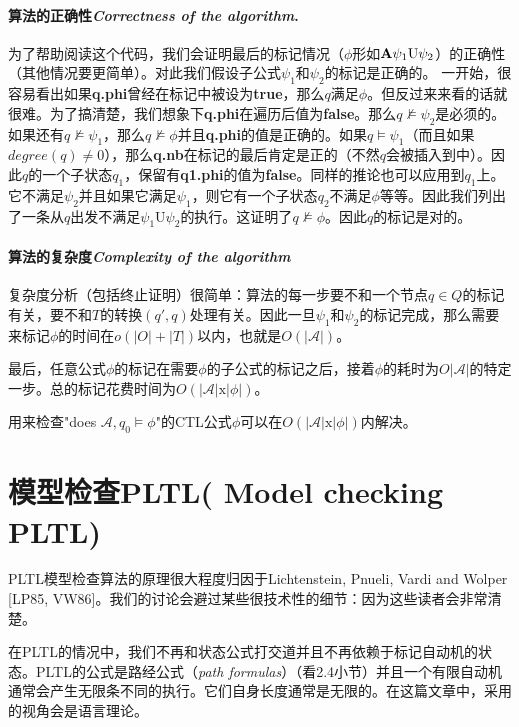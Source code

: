 \documentclass{book}
\begin{document}
    \paragraph{算法的正确性{\itshape Correctness of the algorithm}.}为了帮助阅读这个代码，我们会证明最后的标记情况（$\phi$形如$\text{\textbf{A}}\psi_1\text{U}\psi_2$）的正确性（其他情况要更简单）。对此我们假设子公式$\psi_1$和$\psi_2$的标记是正确的。 一开始，很容易看出如果\textbf{q.phi}曾经在标记中被设为\textbf{true}，那么$q$满足$\phi$。但反过来来看的话就很难。为了搞清楚，我们想象下\textbf{q.phi}在遍历后值为\textbf{false}。那么$q\nvDash\psi_2$是必须的。如果还有$q\nvDash\psi_1$，那么$q\nvDash\phi$并且\textbf{q.phi}的值是正确的。如果$q\models\psi_1$（而且如果$degree(q) \neq 0$），那么\textbf{q.nb}在标记的最后肯定是正的（不然$q$会被插入到中）。因此$q$的一个子状态$q_1$，保留有\textbf{q1.phi}的值为\textbf{false}。同样的推论也可以应用到$q_1$上。它不满足$\psi_2$并且如果它满足$\psi_1$，则它有一个子状态$q_2$不满足$\phi$等等。因此我们列出了一条从$q$出发不满足$\psi_1\text{U}\psi_2$的执行。这证明了$q\nvDash\phi$。因此$q$的标记是对的。

    \paragraph{算法的复杂度{\itshape Complexity of the algorithm}}复杂度分析（包括终止证明）很简单：算法的每一步要不和一个节点$q\in Q$的标记有关，要不和$T$的转换$(q',q)$处理有关。因此一旦$\psi_1$和$\psi_2$的标记完成，那么需要来标记$\phi$的时间在$o(|O|+|T|)$以内，也就是$O(|\mathcal{A}|)$。

    最后，任意公式$\phi$的标记在需要$\phi$的子公式的标记之后，接着$\phi$的耗时为$O|\mathcal{A}|$的特定一步。总的标记花费时间为$O(|\mathcal{A}|\text{x}|\phi|)$。

    用来检查"does $\mathcal{A},q_0\models\phi$"的CTL公式$\phi$可以在$O(|\mathcal{A}|\text{x}|\phi|)$内解决。

    \section{模型检查PLTL( Model checking PLTL)}
    \quad PLTL模型检查算法的原理很大程度归因于Lichtenstein, Pnueli, Vardi and Wolper [LP85, VW86]。我们的讨论会避过某些很技术性的细节：因为这些读者会非常清楚。

    在PLTL的情况中，我们不再和状态公式打交道并且不再依赖于标记自动机的状态。PLTL的公式是路经公式（{\itshape path formulas}）（看2.4小节）并且一个有限自动机通常会产生无限条不同的执行。它们自身长度通常是无限的。在这篇文章中，采用的视角会是语言理论。
\end{document}

